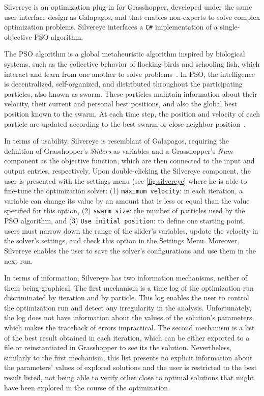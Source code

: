 Silvereye is an optimization plug-in for Grasshopper, developed under the same user interface design as Galapagos, and that enables non-experts to solve complex optimization problems. Silvereye interfaces a \texttt{C\#} implementation of a single-objective \ac{PSO} algorithm.

The \ac{PSO} algorithm is a global metaheuristic algorithm inspired by biological systems, such as the collective behavior of flocking birds and schooling fish, which interact and learn from one another to solve problems~\cite{Brownlee2011}. In \ac{PSO}, the intelligence is decentralized, self-organized, and distributed throughout the participating particles, also known as swarm. These particles maintain information about their velocity, their current and personal best positions, and also the global best position known to the swarm. At each time step, the position and velocity of each particle are updated according to the best swarm or close neighbor position~\cite{Brownlee2011}.

In terms of usability, Silvereye is resemblant of Galapagos, requiring the definition of Grasshopper's \textit{Sliders} as variables and a Grasshopper's \textit{Num} component as the objective function, which are then connected to the input and output entries, respectively. Upon double-clicking the Silvereye component, the user is presented with the settings menu (see \cref{fig:silvereye} where he is able to fine-tune the optimization solver: (1) \texttt{maximum velocity}: in each iteration, a variable can change its value by an amount that is less or equal than the value specified for this option, (2) \texttt{swarm size}: the number of particles used by the \ac{PSO} algorithm, and (3) \texttt{Use initial position}: to define one starting point, users must narrow down the range of the slider's variables, update the velocity in the solver's settings, and check this option in the Settings Menu. Moreover, Silvereye enables the user to save the solver's configurations and use them in the next run.

In terms of information, Silvereye has two information mechanisms, neither of them being graphical. The first mechanism is a time log of the optimization run discriminated by iteration and by particle. This log enables the user to control the optimization run and detect any irregularity in the analysis. Unfortunately, the log does not have information about the values of the solution's parameters, which makes the traceback of errors impractical. The second mechanism is a list of the best result obtained in each iteration, which can be either exported to a file or reinstantiated in Grasshopper to see its the solution. Nevertheless, similarly to the first mechanism, this list presents no explicit information about the parameters' values of explored solutions and the user is restricted to the best result listed, not being able to verify other close to optimal solutions that might have been explored in the course of the optimization.

